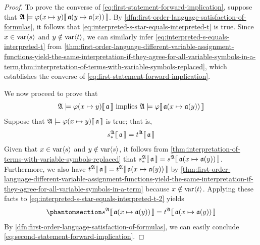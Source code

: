 \begin{proof}
    To prove the converse of \eqref{eq:first-statement-forward-implication}, suppose that
    \( \folwffsatisfaction{\mathfrak{A}}{ \folfreevariablereplacement{\varphi}{x}{y} }{ \folmodifiedvariableassignmentfunction{\mathfrak{a}}{y}{\mathfrak{a}(x)} } \).
    By \cref{dfn:first-order-language-satisfaction-of-formulas}, it follows that \eqref{eq:interpreted-s-star-equals-interpreted-t} is true.
    Since \( x \in \operatorname{var} \langle s\rangle \) and \( y \notin \operatorname{var} \langle t\rangle \), we can similarly infer \eqref{eq:interpreted-s-equals-interpreted-t}
    from \cref{thm:first-order-language-different-variable-assignment-functions-yield-the-same-interpretation-if-they-agree-for-all-variable-symbols-in-a-term,thm:interpretation-of-terms-with-variable-symbols-replaced}, which establishes the converse of \eqref{eq:first-statement-forward-implication}.

    \vspace{0.3cm}
    \noindent
    We now proceed to prove that
    \begin{equation}
        \label{eq:second-statement-forward-implication}
        \folwffsatisfaction{\mathfrak{A}}{ \folfreevariablereplacement{\varphi}{x}{y} }{\mathfrak{a}}
        \ \text{implies}
        \ \folwffsatisfaction{\mathfrak{A}}{\varphi}{ \folmodifiedvariableassignmentfunction{\mathfrak{a}}{x}{\mathfrak{a}(y)} }
    \end{equation}
    Suppose that \( \folwffsatisfaction{\mathfrak{A}}{ \folfreevariablereplacement{\varphi}{x}{y} }{\mathfrak{a}} \) is true;
    that is,
    \begin{equation}
        \label{eq:interpreted-s-star-equals-interpreted-t-2}
        s_{\ast}^{\mathfrak{A}}\llbracket\, \mathfrak{a} \,\rrbracket = t^{\mathfrak{A}}\llbracket\, \mathfrak{a} \,\rrbracket
    \end{equation}
    Given that \( x \in \operatorname{var} \langle s\rangle \) and \( y \notin \operatorname{var} \langle s\rangle \), it follows from
    \cref{thm:interpretation-of-terms-with-variable-symbols-replaced} that
    \( \folterminterpretation{s_{\ast}}{\mathfrak{A}}{\mathfrak{a}} = \folterminterpretation{s}{\mathfrak{A}}{ \folmodifiedvariableassignmentfunction{\mathfrak{a}}{x}{\mathfrak{a}(y)} } \). Furthermore, we also have \( \folterminterpretation{t}{\mathfrak{A}}{\mathfrak{a}} = \folterminterpretation{t}{\mathfrak{A}}{ \folmodifiedvariableassignmentfunction{\mathfrak{a}}{x}{\mathfrak{a}(y)} } \) by \cref{thm:first-order-language-different-variable-assignment-functions-yield-the-same-interpretation-if-they-agree-for-all-variable-symbols-in-a-term} because \( x \notin \operatorname{var} \langle t\rangle \). Applying these facts to \eqref{eq:interpreted-s-star-equals-interpreted-t-2} yields
    \begin{equation}
        \phantomsection \label{eq:interpreted-s-equals-interpreted-t-2}
        \folterminterpretation{s}{\mathfrak{A}}{ \folmodifiedvariableassignmentfunction{\mathfrak{a}}{x}{\mathfrak{a}(y)} }
        =
        \folterminterpretation{t}{\mathfrak{A}}{ \folmodifiedvariableassignmentfunction{\mathfrak{a}}{x}{\mathfrak{a}(y)} }
    \end{equation}
    By \cref{dfn:first-order-language-satisfaction-of-formulas}, we can easily conclude \eqref{eq:second-statement-forward-implication}.


\end{proof}
